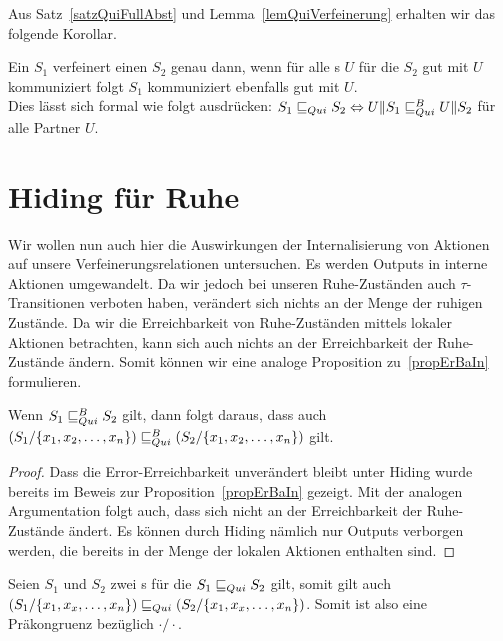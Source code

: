 Aus Satz~\ref{satzQuiFullAbst} und Lemma~\ref{lemQuiVerfeinerung} erhalten wir
das folgende Korollar.

\begin{kor}
  Ein \EIO{} $S_1$ verfeinert einen \EIO{} $S_2$ genau dann, wenn für alle
  \EIO{}s $U$ für die $S_2$ gut mit $U$ kommuniziert folgt $S_1$ kommuniziert
  ebenfalls gut mit $U$.\\
  Dies lässt sich formal wie folgt ausdrücken: $S_1\sqsubseteq _{Qui} S_2\Leftrightarrow
  U\|S_1\sqsubseteq _{Qui}^B U\|S_2$ für alle Partner $U$.
\end{kor}

\section{Hiding für Ruhe}

Wir wollen nun auch hier die Auswirkungen der Internalisierung von Aktionen auf
unsere Verfeinerungsrelationen untersuchen. Es werden Outputs in interne
Aktionen umgewandelt. Da wir jedoch bei unseren Ruhe-Zuständen auch
$\tau$-Transitionen verboten haben, verändert sich nichts an der Menge der ruhigen
Zustände. Da wir die Erreichbarkeit von Ruhe-Zuständen mittels lokaler Aktionen
betrachten, kann sich auch nichts an der Erreichbarkeit der Ruhe-Zustände
ändern. Somit können wir eine analoge Proposition zu~\ref{propErBaIn}
formulieren.

\begin{prop}
  Wenn $S_1\sqsubseteq _{Qui}^B S_2$ gilt, dann folgt daraus, dass auch
  $(S_1/\{x_1,x_2,\dots, x_n\})\sqsubseteq _{Qui}^B (S_2/\{x_1,x_2,\dots, x_n\})$ gilt.
\end{prop}

\begin{proof}
  Dass die Error-Erreichbarkeit unverändert bleibt unter Hiding wurde bereits
  im Beweis zur Proposition~\ref{propErBaIn} gezeigt. Mit der analogen
  Argumentation folgt auch, dass sich nicht an der Erreichbarkeit der
  Ruhe-Zustände ändert. Es können durch Hiding nämlich nur Outputs verborgen
  werden, die bereits in der Menge der lokalen Aktionen enthalten sind.
\end{proof}

\begin{satz}
  \label{satzPraeInterQui}
  Seien $S_1$ und $S_2$ zwei \EIO{}s für die $S_1\sqsubseteq _{Qui} S_2$ gilt, somit gilt
  auch $(S_1/\{x_1,x_x,\dots ,x_n\})\sqsubseteq _{Qui} (S_2/\{x_1,x_x,\dots ,x_n\})$. Somit
  ist also \QRel{} eine Präkongruenz bezüglich $\cdot /\cdot$.
\end{satz}

